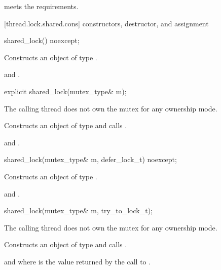 \pnum
\begin{note}  meets the 
requirements. \end{note}

[thread.lock.shared.cons]{ constructors, destructor, and assignment}

%
\begin{itemdecl}
shared_lock() noexcept;
\end{itemdecl}

\begin{itemdescr}
\pnum
\effects Constructs an object of type .

\pnum
\postconditions {} and .
\end{itemdescr}

%
\begin{itemdecl}
explicit shared_lock(mutex_type& m);
\end{itemdecl}

\begin{itemdescr}
\pnum
\requires The calling thread does not own the mutex for any ownership mode.

\pnum
\effects Constructs an object of type  and calls .

\pnum
\postconditions {} and .
\end{itemdescr}

%
\begin{itemdecl}
shared_lock(mutex_type& m, defer_lock_t) noexcept;
\end{itemdecl}

\begin{itemdescr}
\pnum
\effects Constructs an object of type .

\pnum
\postconditions {} and .
\end{itemdescr}

%
\begin{itemdecl}
shared_lock(mutex_type& m, try_to_lock_t);
\end{itemdecl}

\begin{itemdescr}
\pnum
\requires The calling thread does not own the mutex for any ownership mode.

\pnum
\effects Constructs an object of type  and calls .

\pnum
\postconditions {} and 
where  is the
value returned by the call to .
\end{itemdescr}

